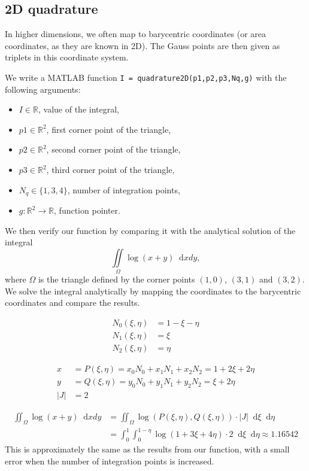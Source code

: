 \documentclass{report}
\renewcommand*\d{\mathop{}\!\mathrm{d}}
\begin{document}
\subsection{2D quadrature} 

In higher dimensions, we often map to barycentric coordinates (or area coordinates, as they are known in 2D). The Gauss points are then given as triplets in this coordinate system.

We write a MATLAB function \texttt{I = quadrature2D(p1,p2,p3,Nq,g)} with the following arguments:
\begin{itemize}
	\item $I\in\mathbb{R}$, value of the integral,
	\item $p1\in\mathbb{R}^2$, first corner point of the triangle,
	\item $p2\in\mathbb{R}^2$, second corner point of the triangle,
	\item $p3\in\mathbb{R}^2$, third corner point of the triangle,
	\item $N_q \in{\{1,3,4\}}$, number of integration points,
	\item $g: \mathbb{R}^2 \rightarrow \mathbb{R}$, function pointer.
\end{itemize}
We then verify our function by comparing it with the analytical solution of the integral
\begin{equation}
	\iint \limits_{\Omega} \log (x+y) \d xdy,
\end{equation}
where $\Omega$ is the triangle defined by the corner points $(1, 0)$, $(3, 1)$ and $(3, 2)$. We solve the integral analytically by mapping the coordinates to the barycentric coordinates and compare the results.  

\begin{align}
	N_0 (\xi,\eta)&=1-\xi-\eta\\ 
	N_1 (\xi,\eta)&=\xi\\
	N_2 (\xi,\eta)&=\eta 
\end{align}

\begin{align}
	x&= P(\xi,\eta)= x_0 N_0 +x_1 N_1 +x_2 N_2 = 1+2\xi+2\eta\\
	y&= Q(\xi,\eta)= y_0 N_0 +y_1 N_1 +y_2 N_2 = \xi+2\eta\\ 
	|J| &=2
\end{align}

\begin{align}
	\iint_\Omega \log(x+y) \d xdy
	&= \iint_\Omega \log(P(\xi,\eta), Q(\xi,\eta))  \cdot |J| \d\xi \d\eta\\   
	&= \int_0^1 \int_0^{1-\eta} \log(1+3\xi+4\eta) \cdot 2 \d\xi \d\eta \approx 1.16542
\end{align}
This is approximately the same as the results from our function, with a small error when the number of integration points is increased.
\end{document}
